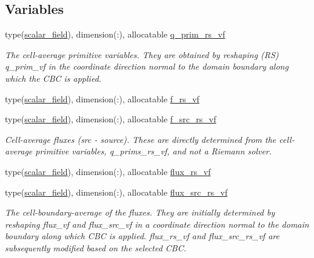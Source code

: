 \subsection*{Variables}
\begin{DoxyCompactItemize}
\item 
type(\hyperlink{structm__derived__types_1_1scalar__field}{scalar\+\_\+field}), dimension(\+:), allocatable \hyperlink{namespacem__cbc_a12e2d4feb2b8425b8f2270a8da529555}{q\+\_\+prim\+\_\+rs\+\_\+vf}
\begin{DoxyCompactList}\small\item\em The cell-\/average primitive variables. They are obtained by reshaping (RS) q\+\_\+prim\+\_\+vf in the coordinate direction normal to the domain boundary along which the C\+BC is applied. \end{DoxyCompactList}\item 
type(\hyperlink{structm__derived__types_1_1scalar__field}{scalar\+\_\+field}), dimension(\+:), allocatable \hyperlink{namespacem__cbc_a9023ac4f88b32e7d88ca8fadb649b84f}{f\+\_\+rs\+\_\+vf}
\item 
type(\hyperlink{structm__derived__types_1_1scalar__field}{scalar\+\_\+field}), dimension(\+:), allocatable \hyperlink{namespacem__cbc_ab079ec31add26b8d5f591b3cb5e5b88f}{f\+\_\+src\+\_\+rs\+\_\+vf}
\begin{DoxyCompactList}\small\item\em Cell-\/average fluxes (src -\/ source). These are directly determined from the cell-\/average primitive variables, q\+\_\+prims\+\_\+rs\+\_\+vf, and not a Riemann solver. \end{DoxyCompactList}\item 
type(\hyperlink{structm__derived__types_1_1scalar__field}{scalar\+\_\+field}), dimension(\+:), allocatable \hyperlink{namespacem__cbc_abbb35cbd4d0951e9231865bd4120e682}{flux\+\_\+rs\+\_\+vf}
\item 
type(\hyperlink{structm__derived__types_1_1scalar__field}{scalar\+\_\+field}), dimension(\+:), allocatable \hyperlink{namespacem__cbc_a5075a07fe184dfe7d109f6b4e14f7302}{flux\+\_\+src\+\_\+rs\+\_\+vf}
\begin{DoxyCompactList}\small\item\em The cell-\/boundary-\/average of the fluxes. They are initially determined by reshaping flux\+\_\+vf and flux\+\_\+src\+\_\+vf in a coordinate direction normal to the domain boundary along which C\+BC is applied. flux\+\_\+rs\+\_\+vf and flux\+\_\+src\+\_\+rs\+\_\+vf are subsequently modified based on the selected C\+BC. \end{DoxyCompactList}\item 

\end{DoxyCompactItemize}
